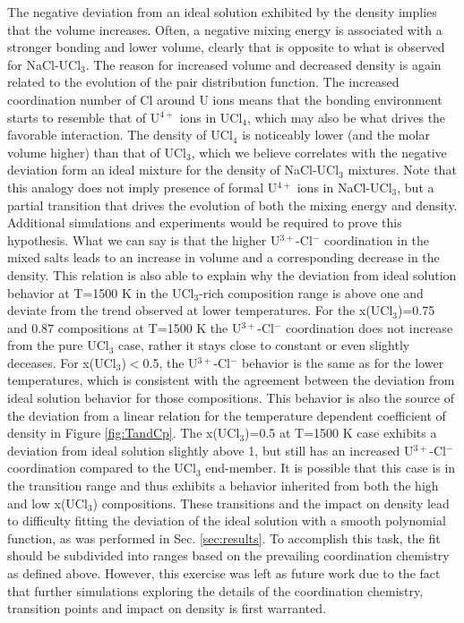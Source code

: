 \documentclass[preprint,3p,10pt,onecolumn,number,sort&compress]{elsarticle}
\begin{document}
{The negative deviation from an ideal solution exhibited by the density implies that the volume increases. Often, a negative mixing energy is associated with a stronger bonding and lower volume, clearly that is opposite to what is observed for NaCl-UCl$_3$. The reason for increased volume and decreased density is again related to the evolution of the pair distribution function. The increased coordination number of Cl around U ions means that the bonding environment starts to resemble that of U$^{4+}$ ions in UCl$_4$, which may also be what drives the favorable interaction. The density of UCl$_4$ is noticeably lower (and the molar volume higher) than that of UCl$_3$, which we believe correlates with the negative deviation form an ideal mixture for the density of NaCl-UCl$_3$ mixtures. Note that this analogy does not imply  presence of formal U$^{4+}$ ions in NaCl-UCl$_3$, but a partial transition that drives the evolution of both the mixing energy and density. Additional simulations and experiments would be required to prove this hypothesis. What we can say is that the higher U$^{3+}$-Cl$^{-}$ coordination in the mixed salts leads to an increase in volume and a corresponding decrease in the density. This relation is also able to explain why the deviation from ideal solution behavior at T=1500 K in the UCl$_3$-rich composition range is above one and deviate from the trend observed at lower temperatures. For the x(UCl$_3$)=0.75 and 0.87 compositions at T=1500 K the U$^{3+}$-Cl$^{-}$ coordination does not increase from the pure UCl$_3$ case, rather it stays close to constant or even slightly deceases. For x(UCl$_3$)$<$0.5, the U$^{3+}$-Cl$^{-}$ behavior is the same as for the lower temperatures, which is consistent with the agreement between the deviation from ideal solution behavior for those compositions. This behavior is also the source of the deviation from a linear relation for the temperature dependent coefficient of density in Figure \ref{fig:TandCp}. The x(UCl$_3$)=0.5 at T=1500 K case exhibits a deviation from ideal solution slightly above 1, but still has an increased U$^{3+}$-Cl$^{-}$ coordination compared to the UCl$_3$ end-member. It is possible that this case is in the transition range and thus exhibits a behavior inherited from both the high and low x(UCl$_3$) compositions. These transitions and the impact on density lead to difficulty fitting the deviation of the ideal solution with a smooth polynomial function, as was performed in Sec. \ref{sec:results}. To accomplish this task, the fit should be subdivided into ranges based on the prevailing coordination chemistry as defined above. However, this exercise was left as future work due to the fact that further simulations exploring the details of the coordination chemistry, transition points and impact on density is first warranted.

}
\end{document}
